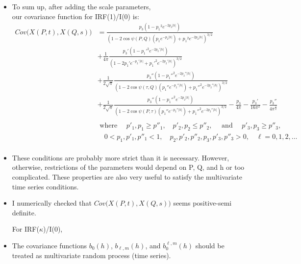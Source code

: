 \documentclass[11pt]{article}
\begin{document}
\begin{itemize}
\item To sum up, after adding the scale parameters,\\ 
our covariance function for IRF(1)/I(0) is: \\
\begin{align*}
Cov\biggl(X(P,t), X(Q,s)\biggl) &= \frac{p_3(1 - {p_1}^2 e^{-2 p_2 \lvert h \lvert})}{(1-2 \cos{\psi(P, Q)} (p_1 e^{-p_2 \lvert h \lvert}) + {p_1}^2 e^{-2p_2 \lvert h \lvert})^{3/2}}\\
&+ \frac{1}{4\pi}\frac{p_3'(1 - {p_1'}^2 e^{-2 p_2' \lvert h \lvert})}{(1-2 p_1' e^{-p_2' \lvert h \lvert} + {p_1'}^2 e^{-2p_2' \lvert h \lvert})^{3/2}}\\ 
&+ \frac{1}{2\sqrt{\pi}}\frac{p_3''(1 - {p_1''}^2 e^{-2 p_2'' \lvert h \lvert})}{(1-2 \cos{\psi(\tau, Q)} (p_1'' e^{-p_2'' \lvert h \lvert}) + {p_1''}^2 e^{-2p_2'' \lvert h \lvert})^{3/2}}\\
& + \frac{1}{2\sqrt{\pi}} \frac{p_3''(1 - {p_1''}^2 e^{-2 p_2 \lvert h \lvert})}{(1-2 \cos{\psi(P, \tau)} (p_1'' e^{-p_2'' \lvert h \lvert}) + {p_1''}^2 e^{-2p_2'' \lvert h \lvert})^{3/2}} - \frac{p_3}{4\pi} - \frac{p_3'}{16\pi^2} - \frac{p_3''}{4\pi^\frac{3}{2}}\\
\\
&\text{ where } \quad p'_1, p_1 \ge p''_1, \quad p'_2, p_2 \le p''_2, \quad \text{ and } \quad p'_3, p_3 \ge p''_3,\\
&\quad 0<p_1,p'_1,p''_1<1, \quad p_2, p'_2, p''_2, p_3, p'_3, p''_3 > 0, \quad \ell=0,1,2,\dots\\
\end{align*}

\item These conditions are probably more strict than it is necessary. However, otherwise, restrictions of the parameters would depend on P, Q, and h or too complicated. These properties are also very useful to satisfy the multivariate time series conditions.\\

\item I numerically checked that $Cov\biggl(X(P,t), X(Q,s)\biggl)$ seems positive-semi definite.\\

\pagebreak

For IRF($\kappa$)/I(0),\\

\item The covariance functions $b_0(h)$, $b_{\ell, m}(h)$, and $b_0^{\ell,m}(h)$ should be treated as multivariate random process (time series).\\


\end{itemize}
\end{document}
